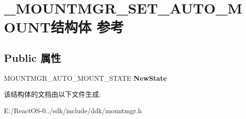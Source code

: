 \hypertarget{struct___m_o_u_n_t_m_g_r___s_e_t___a_u_t_o___m_o_u_n_t}{}\section{\+\_\+\+M\+O\+U\+N\+T\+M\+G\+R\+\_\+\+S\+E\+T\+\_\+\+A\+U\+T\+O\+\_\+\+M\+O\+U\+N\+T结构体 参考}
\label{struct___m_o_u_n_t_m_g_r___s_e_t___a_u_t_o___m_o_u_n_t}
\subsection*{Public 属性}
\begin{DoxyCompactItemize}
\item 
\mbox{\label{struct___m_o_u_n_t_m_g_r___s_e_t___a_u_t_o___m_o_u_n_t_a0722172003edefe3eefb5fd730337300}} 
M\+O\+U\+N\+T\+M\+G\+R\+\_\+\+A\+U\+T\+O\+\_\+\+M\+O\+U\+N\+T\+\_\+\+S\+T\+A\+TE {\bfseries New\+State}
\end{DoxyCompactItemize}


该结构体的文档由以下文件生成\+:\begin{DoxyCompactItemize}
\item 
E\+:/\+React\+O\+S-\/0../sdk/include/ddk/mountmgr.\+h\end{DoxyCompactItemize}
